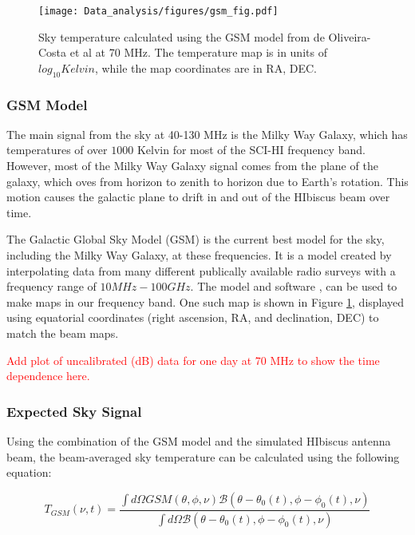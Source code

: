 \begin{figure}[htb]
\begin{center}
\texttt{[image: Data\_analysis/figures/gsm\_fig.pdf]}
\caption{Sky temperature calculated using the GSM model from de Oliveira-Costa et al \cite{GSM_model} at 70 MHz. The temperature map is in units of $log_{10} Kelvin$, while the map coordinates are in RA, DEC. }
\label{Fig:GSM_model}
\end{center}
\end{figure}

\subsubsection{GSM Model}\label{Sec:GSM}

The main signal from the sky at 40-130 MHz is the Milky Way Galaxy, which has temperatures of over $1000$ Kelvin for most of the SCI-HI frequency band. However, most of the Milky Way Galaxy signal comes from the plane of the galaxy, which oves from horizon to zenith to horizon due to Earth's rotation. This motion causes the galactic plane to drift in and out of the HIbiscus beam over time. 


The Galactic Global Sky Model (GSM) is the current best model for the sky, including the Milky Way Galaxy, at these frequencies. It is a model created by interpolating data from many different publically available radio surveys with a frequency range of $10 MHz - 100 GHz$. The model and software \cite{GSM_model}, can be used to make maps in our frequency band. One such map is shown in Figure \ref{Fig:GSM_model}, displayed using equatorial coordinates (right ascension, RA, and declination, DEC) to match the beam maps. 

\textcolor{red}{Add plot of uncalibrated (dB) data for one day at 70 MHz to show the time dependence here.}

\subsubsection{Expected Sky Signal}

Using the combination of the GSM model and the simulated HIbiscus antenna beam, the beam-averaged sky temperature can be calculated using the following equation: 

\begin{equation}
T_{GSM} (\nu,t) = \frac{ \int d \Omega GSM (\theta, \phi, \nu) \mathcal{B} (\theta - \theta_0(t), \phi - \phi_0(t),\nu)}{\int d\Omega \mathcal{B} (\theta -\theta_0(t), \phi - \phi_0(t), \nu)}
\end{equation}

